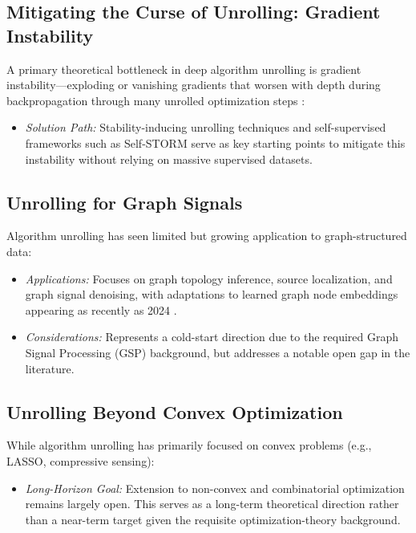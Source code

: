 \documentclass[conference]{IEEEtran}
\begin{document}
\subsection{Mitigating the Curse of Unrolling: Gradient Instability}
A primary theoretical bottleneck in deep algorithm unrolling is gradient instability—exploding or vanishing gradients that worsen with depth during backpropagation through many unrolled optimization steps \cite{chen2022curse, mehmood2026curse, gao2025learning}:
\begin{itemize}
    \item[\textbullet] \textit{Solution Path:} Stability-inducing unrolling techniques and self-supervised frameworks such as Self-STORM \cite{maj2022combining, sahel2024selfstorm} serve as key starting points to mitigate this instability without relying on massive supervised datasets.
\end{itemize}

\subsection{Unrolling for Graph Signals}
Algorithm unrolling has seen limited but growing application to graph-structured data:
\begin{itemize}
    \item[\textbullet] \textit{Applications:} Focuses on graph topology inference, source localization, and graph signal denoising, with adaptations to learned graph node embeddings appearing as recently as 2024 \cite{shlezinger2025deep}.
    \item[\textbullet] \textit{Considerations:} Represents a cold-start direction due to the required Graph Signal Processing (GSP) background, but addresses a notable open gap in the literature.
\end{itemize}

\subsection{Unrolling Beyond Convex Optimization}
While algorithm unrolling has primarily focused on convex problems (e.g., LASSO, compressive sensing):
\begin{itemize}
    \item[\textbullet] \textit{Long-Horizon Goal:} Extension to non-convex and combinatorial optimization remains largely open. This serves as a long-term theoretical direction rather than a near-term target given the requisite optimization-theory background.
\end{itemize}
\end{document}
